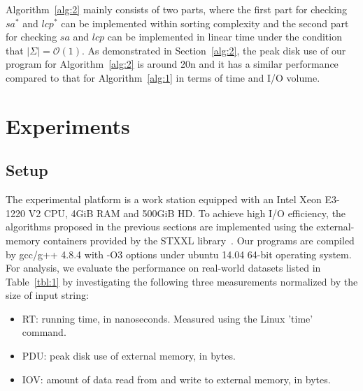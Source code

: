 \documentclass[10pt,journal,compsoc]{IEEEtran}
\begin{document}
Algorithm~\ref{alg:2} mainly consists of two parts, where the first part for checking $sa^*$ and $lcp^*$ can be implemented within sorting complexity and the second part for checking $sa$ and $lcp$ can be implemented in linear time under the condition that $|\Sigma| = \mathcal{O}(1)$. As demonstrated in Section~\ref{alg:2}, the peak disk use of our program for Algorithm~\ref{alg:2} is around 20n and it has a similar performance compared to that for Algorithm~\ref{alg:1} in terms of time and I/O volume.

\section{Experiments} \label{sec:experiment}

\subsection{Setup} \label{sec:experiment:setup}

The experimental platform is a work station equipped with an Intel Xeon E3-1220 V2 CPU, 4GiB RAM and 500GiB HD. To achieve high I/O efficiency, the algorithms proposed in the previous sections are implemented using the external-memory containers provided by the STXXL library~\cite{Dementiev2007}. Our programs are compiled by gcc/g++ 4.8.4 with -O3 options under ubuntu 14.04 64-bit operating system. For analysis, we evaluate the performance on real-world datasets listed in Table~\ref{tbl:1} by investigating the following three measurements normalized by the size of input string:

\begin{itemize}
	
	\item RT: running time, in nanoseconds. Measured using the Linux 'time' command.
	
	\item PDU: peak disk use of external memory, in bytes.
	
	\item IOV: amount of data read from and write to external memory, in bytes.
	
\end{itemize}
	
\end{document}
